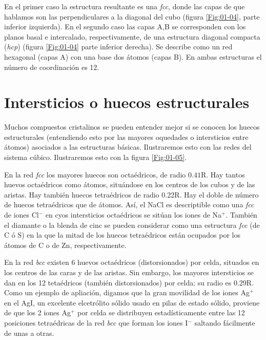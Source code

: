 En el primer caso la estructura resultante es una {\it fcc}, donde las capas de que hablamos son las perpendiculares a la diagonal del cubo (figura \ref{Fig:01-04}, parte inferior izquierda). En el segundo caso las capas A,B se corresponden con los planos basal e intercalado, respectivamente, de una estructura diagonal compacta ({\it hcp}) (figura \ref{Fig:01-04} parte inferior derecha). Se describe como un red hexagonal (capas A) con una base dos átomos (capas B). En ambas estructuras el número de coordinación es 12.


\section{Intersticios o huecos estructurales}

Muchos compuestos cristalinos se pueden entender mejor si se conocen los huecos estructurales (entendiendo esto por las mayores oquedades o intersticios entre átomos) asociados a las estructuras básicas. Ilustraremos esto con las redes del sistema cúbico. Ilustraremos esto con la figura \ref{Fig:01-05}.

En la red \textit{fcc} los mayores huecos son octaédricos, de radio $0.41$R. Hay tantos huevos octaédricos como átomos, situándose en los centros de los cubos y de las aristas. Hay también huecos tetraédricos de radio 0.22R. Hay el doble de número de huecos tetraédricos que de átomos. Así, el NaCl es descriptible como una {\it fcc} de iones Cl$^-$ en cyos intersticios octaédricos se sitúan los iones de Na$^+$. También el diamante o la blenda de cinc se pueden considerar como una estructura {\it fcc} (de C ó S) en la que la mitad de los huecos tetraédricos están ocupados por los átomos de C o de Zn, respectivamente.

En la red {\it bcc} existen 6 huevos octaédricos (distorsionados) por celda, situados en los centros de las caras y de las aristas. Sin embargo, los mayores intersticios se dan en los 12 tetaédricos (también distorsionados) por celda: su radio es 0.29R. Como un ejemplo de apliación, digamos que la gran movilidad de los iones Ag$^+$ en el AgI, un excelente elcetrólito sólido usado en pilas de estado sólido, proviene de que los 2 iones Ag$^+$ por celda se distribuyen estadísticamente entre las 12 posiciones tetraédricas de la red {\it bcc} que forman los iones I$^-$ saltando fácilmente de unas a otras.


